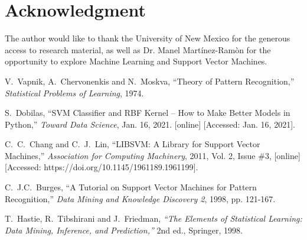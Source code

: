 \documentclass[journal]{IEEEtran}
\begin{document}
\section*{Acknowledgment}
The author would like to thank the University of New Mexico for the generous access to research material, as well as Dr. Manel Martínez-Ramòn for the opportunity to explore Machine Learning and Support Vector Machines.

\begin{thebibliography}{6}

V.~Vapnik, A.~Chervonenkis and N.~Moskva, \enquote{Theory of Pattern Recognition,} \textit{Statistical Problems of Learning}, 1974.

S.~Dobilas, \enquote{SVM Classifier and RBF Kernel -- How to Make Better Models in Python,} \emph{Toward Data Science}, Jan. 16, 2021. [online] [Accessed: Jan. 16, 2021].

C.~C.~Chang and C.~J.~Lin, \enquote{LIBSVM: A Library for Support Vector Machines,} \textit{Association for Computing Machinery}, 2011, Vol. 2,
Issue \#3, [online] [Accessed: https://doi.org/10.1145/1961189.1961199].

C.~J.C.~Burges, \enquote{A Tutorial on Support Vector Machines for Pattern Recognition,} \textit{Data Mining and Knowledge Discovery 2}, 1998, pp. 121-167.

T.~Hastie, R.~Tibshirani and J.~Friedman, \textit{\enquote{The Elements of
Statistical Learning: Data Mining, Inference, and Prediction,}} 2nd ed., Springer, 1998.

\end{thebibliography}
\end{document}
